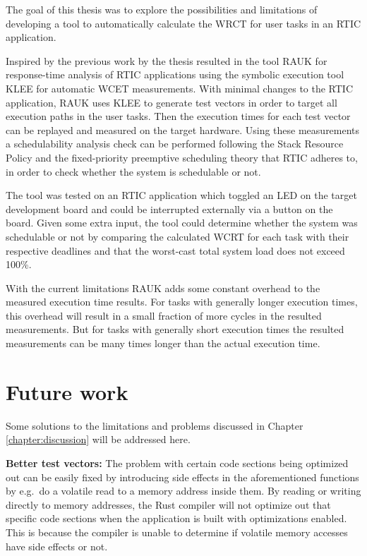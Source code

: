 The goal of this thesis was to explore the possibilities and limitations of
developing a tool to automatically calculate the WRCT for user tasks in an
RTIC application.

Inspired by the previous work by \cite{lindner} the thesis resulted in the tool
RAUK for response-time analysis of RTIC applications using the symbolic
execution tool KLEE for automatic WCET measurements. With minimal changes to
the RTIC application, RAUK uses KLEE to generate test vectors in order to
target all execution paths in the user tasks. Then the execution times for each
test vector can be replayed and measured on the target hardware. Using these
measurements a schedulability analysis check can be performed following the Stack
Resource Policy and the fixed-priority preemptive scheduling theory that RTIC
adheres to, in order to check whether the system is schedulable or not.

The tool was tested on an RTIC application which toggled an LED on the
target development board and could be interrupted externally via a button
on the board. Given some extra input, the tool could determine whether
the system was schedulable or not by comparing the calculated WCRT for
each task with their respective deadlines and that the worst-cast total
system load does not exceed 100\%.

With the current limitations RAUK adds some constant overhead to the measured
execution time results. For tasks with generally longer execution times, this
overhead will result in a small fraction of more cycles in the resulted
measurements. But for tasks with generally short execution times the resulted
measurements can be many times longer than the actual execution time.

\section{Future work}
Some solutions to the limitations and problems discussed in Chapter
\ref{chapter:discussion} will be addressed here.

\textbf{Better test vectors:} The problem with certain code sections being
optimized out can be easily fixed by introducing side effects in the
aforementioned functions by e.g.\ do a volatile read to a memory address inside
them. By reading or writing directly to memory addresses, the Rust compiler
will not optimize out that specific code sections when the application is built
with optimizations enabled. This is because the compiler is unable to determine
if volatile memory accesses have side effects or not.

